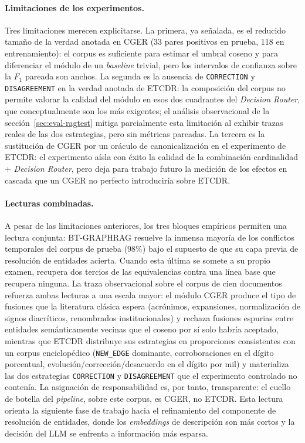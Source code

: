 \paragraph{Limitaciones de los experimentos.} Tres limitaciones merecen explicitarse. La primera, ya señalada, es el reducido tamaño de la verdad anotada en CGER (33 pares positivos en prueba, 118 en entrenamiento): el corpus es suficiente para estimar el umbral coseno y para diferenciar el módulo de un \emph{baseline} trivial, pero los intervalos de confianza sobre la $F_1$ pareada son anchos. La segunda es la ausencia de \texttt{CORRECTION} y \texttt{DISAGREEMENT} en la verdad anotada de ETCDR: la composición del corpus no permite valorar la calidad del módulo en esos dos cuadrantes del \emph{Decision Router}, que conceptualmente son los más exigentes; el análisis observacional de la sección~\ref{sec:eval-ragtest} mitiga parcialmente esta limitación al exhibir trazas reales de las dos estrategias, pero sin métricas pareadas. La tercera es la sustitución de CGER por un oráculo de canonicalización en el experimento de ETCDR: el experimento aísla con éxito la calidad de la combinación cardinalidad + \emph{Decision Router}, pero deja para trabajo futuro la medición de los efectos en cascada que un CGER no perfecto introduciría sobre ETCDR.

\paragraph{Lecturas combinadas.} A pesar de las limitaciones anteriores, los tres bloques empíricos permiten una lectura conjunta: BT-GRAPHRAG resuelve la inmensa mayoría de los conflictos temporales del corpus de prueba ($98\%$) bajo el supuesto de que su capa previa de resolución de entidades acierta. Cuando esta última se somete a su propio examen, recupera dos tercios de las equivalencias contra una línea base que recupera ninguna. La traza observacional sobre el corpus de cien documentos refuerza ambas lecturas a una escala mayor: el módulo CGER produce el tipo de fusiones que la literatura clásica espera (acrónimos, expansiones, normalización de signos diacríticos, renombrados institucionales) y rechaza fusiones espurias entre entidades semánticamente vecinas que el coseno por sí solo habría aceptado, mientras que ETCDR distribuye sus estrategias en proporciones consistentes con un corpus enciclopédico (\texttt{NEW\_EDGE} dominante, corroboraciones en el dígito porcentual, evolución/corrección/desacuerdo en el dígito por mil) y materializa las dos estrategias \texttt{CORRECTION} y \texttt{DISAGREEMENT} que el experimento controlado no contenía. La asignación de responsabilidad es, por tanto, transparente: el cuello de botella del \emph{pipeline}, sobre este corpus, es CGER, no ETCDR. Esta lectura orienta la siguiente fase de trabajo hacia el refinamiento del componente de resolución de entidades, donde los \emph{embeddings} de descripción son más cortos y la decisión del LLM se enfrenta a información más esparsa.

